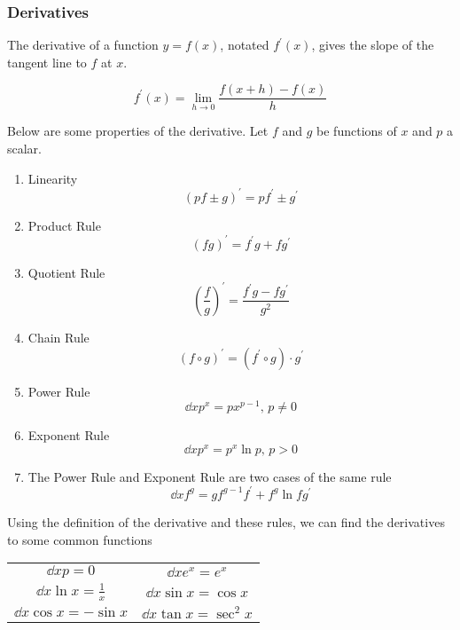\subsubsection{Derivatives}
The derivative of a function $y = f(x)$, notated $f^\prime(x)$, gives the slope of the tangent line to $f$ at $x$.
\begin{definition}
	\begin{equation*}
		f^\prime(x) = \lim\limits_{h \to 0}{\frac{f(x+h) - f(x)}{h}}
	\end{equation*}
\end{definition}

\noindent
Below are some properties of the derivative. Let $f$ and $g$ be functions of $x$ and $p$ a scalar.
\begin{enumerate}[label=]
	\item Linearity
	\begin{equation*}
	\left( pf \pm g \right)^\prime = pf^\prime \pm g^\prime
	\end{equation*}
	\item Product Rule
	\begin{equation*}
	\left( fg \right)^\prime = f^\prime g + f g^\prime
	\end{equation*}
	\item Quotient Rule
	\begin{equation*}
	\left( \frac{f}{g} \right)^\prime = \frac{f^\prime g - f g^\prime}{g^2}
	\end{equation*}
	\item Chain Rule
	\begin{equation*}
	\left( f \circ g \right)^\prime = \left( f^\prime \circ g \right) \cdot g^\prime
	\end{equation*}
	\item Power Rule
	\begin{equation*}
	\dd{x} p^x = px^{p-1} \text{, } p \neq 0
	\end{equation*}
	\item Exponent Rule
	\begin{equation*}
	\dd{x} p^x = p^x \ln{p} \text{, } p > 0
	\end{equation*}
	\item The Power Rule and Exponent Rule are two cases of the same rule
	\begin{equation*}
	\dd{x} f^g = gf^{g-1}f^\prime + f^g\ln{f}g^\prime
	\end{equation*}
\end{enumerate}
Using the definition of the derivative and these rules, we can find the derivatives to some common functions\\
\begin{center}
	\begin{tabular}{c | c}
		\large{$\dd{}{x} p = 0$} 				& \large{$\dd{}{x} e^x = e^x$} 			\\ [0.75em]
		\large{$\dd{}{x} \ln{x} = \frac{1}{x}$} & \large{$\dd{}{x} \sin{x} = \cos{x}$} 	\\ [0.75em]
		\large{$\dd{}{x} \cos{x} = -\sin{x}$} 	& \large{$\dd{}{x} \tan{x} = \sec^2{x}$}
	\end{tabular}
\end{center}
